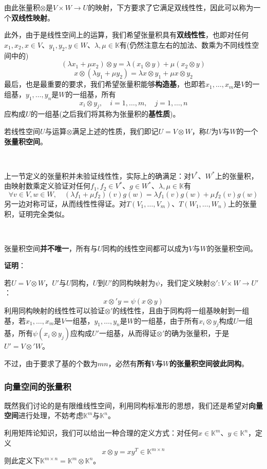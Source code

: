 \documentclass[a4paper,UTF8,fontset=windows,AutoFakeBold]{ctexart}
\newcommand*{\note}{\noindent *}
\newcommand{\proo}[1]{{\vspace{5pt}\kaishu\noindent\textbf{证明}：\vspace{-3pt}
\begin{compactitem}
    \item[] #1
\end{compactitem}
}}
\begin{document}
\note 由此张量积$\otimes$是$V\times W\to U$的映射，下方要求了它满足双线性性，因此可以称为一个\textbf{双线性映射}。

此外，由于是线性空间上的运算，我们希望张量积具有\textbf{双线性性}，也即对任何$x_1,x_2,x\in V$、$y_1,y_2,y\in W$、$\lambda,\mu\in\mathbb{K}$有(仍然注意左右的加法、数乘为不同线性空间中的)
$$(\lambda x_1+\mu x_2)\otimes y=\lambda(x_1\otimes y)+\mu(x_2\otimes y)$$
$$x\otimes(\lambda y_1+\mu y_2)=\lambda x\otimes y_1+\mu x\otimes y_2$$
最后，也是最重要的要求，我们希望张量积能够\textbf{构造基}，也即若$x_1,\dots,x_m$是$V$的一组基，$y_1,\dots,y_n$是$W$的一组基，所有
$$x_i\otimes y_j,\quad i=1,\dots,m,\quad j=1,\dots,n$$
应构成$U$的一组基(之后我们将其称为张量积的\textbf{基性质})。

若线性空间$U$与运算$\otimes$满足上述的性质，我们即记$U=V\otimes W$，称$U$为$V$与$W$的一个\textbf{张量积空间}。

\

\note 上一节定义的张量积并未验证线性性，实际上的确满足：对$V^*$、$W^*$上的张量积，由映射数乘定义验证对任何$f_1,f_2\in V^*$、$g\in W^*$、$\lambda,\mu\in\mathbb{K}$有
$$\forall v\in V,w\in W,\quad(\lambda f_1+\mu f_2)(v)g(w)=\lambda f_1(v)g(w)+\mu f_2(v)g(w)$$
另一边对称可证，从而线性性得证。对$T(V_1,\dots,V_m)$、$T(W_1,\dots,W_n)$上的张量积，证明完全类似。

\

张量积空间\textbf{并不唯一}，所有与$U$同构的线性空间都可以成为$V$与$W$的张量积空间。

\proo{
    若$U=V\otimes W$，$U'$与$U$同构，$U$到$U'$的同构映射为$\psi$，我们定义映射$\otimes':V\times W\to U'$：
    $$x\otimes' y=\psi(x\otimes y)$$
    利用同构映射的线性性可以验证$\otimes'$的线性性，且由于同构将一组基映射到一组基，若$x_1,\dots,x_m$是$V$一组基，$y_1,\dots,y_n$是$W$的一组基，由于所有$x_i\otimes y_j$构成$U$一组基，所有$\psi(x_i\otimes y_j)$应构成$U'$一组基，从而得证$\otimes'$的确为张量积，于是$U'=V\otimes'W$。
}

不过，由于要求了基的个数为$mn$，必然有\textbf{所有$V$与$W$的张量积空间彼此同构}。

\subsubsection{向量空间的张量积}

既然我们讨论的是有限维线性空间，利用同构标准形的思想，我们还是希望对\textbf{向量空间}进行处理，不妨考虑$\mathbb{K}^m$与$\mathbb{K}^n$。

利用矩阵论知识，我们可以给出一种合理的定义方式：对任何$x\in\mathbb{K}^m$、$y\in\mathbb{K}^n$，定义
$$x\otimes y=xy^T\in\mathbb{K}^{m\times n}$$
则此定义下$\mathbb{K}^{m\times n}=\mathbb{K}^m\otimes\mathbb{K}^n$。
\end{document}
